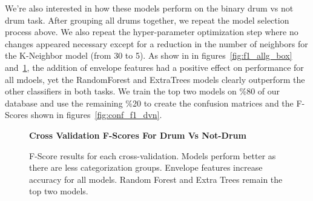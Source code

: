 \documentclass[\main/thesis.tex]{subfiles}
\begin{document}
We're also interested in how these models perform on the binary drum vs not drum task.
After grouping all drums together, we repeat the model selection process above. We also repeat the hyper-parameter optimization step where no changes appeared necessary except for a reduction in the number of neighbors for the K-Neighbor model (from 30 to 5). As show in in figures~\ref{fig:f1_allg_box} and~\ref{fig:f1_dvn_box}, the addition of envelope features had a positive effect on performance for all mdoels, yet the RandomForest and ExtraTrees models clearly outperform the other classifiers in both tasks. We train the top two models on \%80 of our database and use the remaining \%20 to create the confusion matrices and the F-Scores shown in figures~\ref{fig:conf_f1_dvn}.
\begin{figure}[h!]   
    \begin{center}
        \textbf{Cross Validation F-Scores For Drum Vs Not-Drum}
    \caption{F-Score results for each cross-validation. Models perform better as there are less categorization groups. Envelope features increase accuracy for all models. Random Forest and Extra Trees remain the top two models. }
    \label{fig:f1_dvn_box}
    \end{center}
\end{figure}
\end{document}
